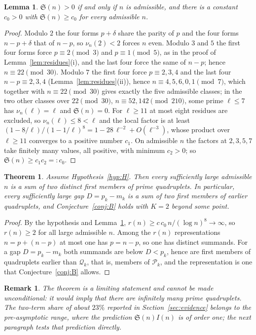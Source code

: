\documentclass[11pt,a4paper]{article}
\newtheorem{lemma}{Lemma}
\newtheorem{remark}{Remark}
\newtheorem{theorem}{Theorem}
\newcommand{\Q}{\mathcal{Q}}
\newcommand{\Pool}{\mathcal{P}}
\begin{document}
\begin{lemma}
\label{lem:sing}
$\mathfrak S(n)>0$ if and only if $n$ is admissible, and there is a
constant $c_0>0$ with $\mathfrak S(n)\ge c_0$ for every admissible $n$.
\end{lemma}
\begin{proof}
Modulo $2$ the four forms $p+\delta$ share the parity of $p$ and the four
forms $n-p+\delta$ that of $n-p$, so $\nu_n(2)<2$ forces $n$ even. Modulo
$3$ and $5$ the first four forms force $p\equiv 2 \pmod 3$ and
$p\equiv 1 \pmod 5$, as in the proof of Lemma~\ref{lem:residues}(i), and
the last four force the same of $n-p$; hence $n\equiv 22 \pmod{30}$.
Modulo $7$ the first four force $p\equiv 2,3,4$ and the last four
$n-p\equiv 2,3,4$ (Lemma~\ref{lem:residues}(ii)), hence
$n\equiv 4,5,6,0,1 \pmod 7$, which together with $n\equiv 22 \pmod{30}$
gives exactly the five admissible classes; in the two other classes over
$22 \pmod{30}$, $n\equiv 52,142 \pmod{210}$, some prime $\ell\le7$ has
$\nu_n(\ell)=\ell$ and $\mathfrak S(n)=0$. For $\ell\ge 11$ at most eight
residues are excluded, so $\nu_n(\ell)\le 8<\ell$ and the local factor is
at least $(1-8/\ell)/(1-1/\ell)^8 = 1 - 28\,\ell^{-2} + O(\ell^{-3})$,
whose product over $\ell\ge11$ converges to a positive number $c_1$. On
admissible $n$ the factors at $2,3,5,7$ take finitely many values, all
positive, with minimum $c_2>0$; so $\mathfrak S(n)\ge c_1c_2=:c_0$.
\end{proof}

\begin{theorem}
\label{thm:two}
Assume Hypothesis~\ref{hyp:H}. Then every sufficiently large admissible
$n$ is a sum of two distinct first members of prime quadruplets. In
particular, every sufficiently large gap $D=p_k-m_k$ is a sum of two first
members of earlier quadruplets, and Conjecture~\ref{conj:B} holds with
$K=2$ beyond some point.
\end{theorem}
\begin{proof}
By the hypothesis and Lemma~\ref{lem:sing},
$r(n)\ge c\,c_0\,n/(\log n)^8\to\infty$, so $r(n)\ge2$ for all large
admissible $n$. Among the $r(n)$ representations $n=p+(n-p)$ at most one
has $p=n-p$, so one has distinct summands. For a gap $D=p_k-m_k$ both
summands are below $D<p_k$, hence are first members of quadruplets earlier
than $\Q_k$, that is, members of $\Pool_k$, and the representation is one
that Conjecture~\ref{conj:B} allows.
\end{proof}

\begin{remark}
The theorem is a limiting statement and cannot be made unconditional: it
would imply that there are infinitely many prime quadruplets. The two-term
share of about $23\%$ reported in Section~\ref{sec:evidence} belongs to
the pre-asymptotic range, where the prediction $\mathfrak S(n)I(n)$ is of
order one; the next paragraph tests that prediction directly.
\end{remark}
\end{document}
